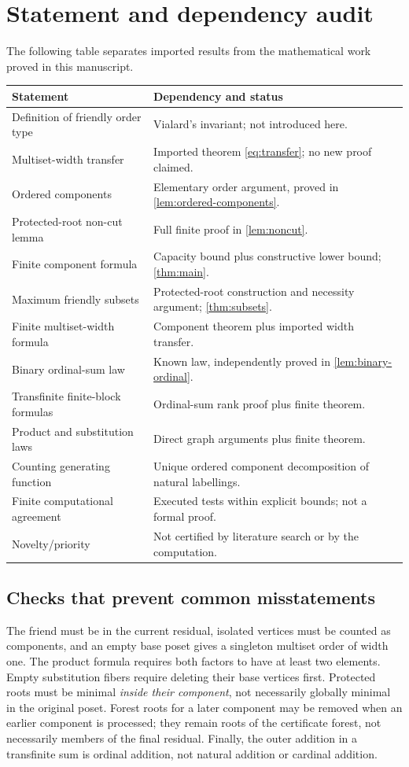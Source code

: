 \documentclass[11pt,letterpaper]{article}
\theoremstyle{definition}
\theoremstyle{remark}
\begin{document}
\section{Statement and dependency audit}
\label{sec:audit}
The following table separates imported results from the mathematical work
proved in this manuscript.
\begin{center}
\small
\begin{tabular}{p{} p{}}
\toprule
Statement & Dependency and status\\
\midrule
Definition of friendly order type & Vialard's invariant; not introduced here.\\
Multiset-width transfer & Imported theorem \eqref{eq:transfer}; no new proof claimed.\\
Ordered components & Elementary order argument, proved in \cref{lem:ordered-components}.\\
Protected-root non-cut lemma & Full finite proof in \cref{lem:noncut}.\\
Finite component formula & Capacity bound plus constructive lower bound; \cref{thm:main}.\\
Maximum friendly subsets & Protected-root construction and necessity argument; \cref{thm:subsets}.\\
Finite multiset-width formula & Component theorem plus imported width transfer.\\
Binary ordinal-sum law & Known law, independently proved in \cref{lem:binary-ordinal}.\\
Transfinite finite-block formulas & Ordinal-sum rank proof plus finite theorem.\\
Product and substitution laws & Direct graph arguments plus finite theorem.\\
Counting generating function & Unique ordered component decomposition of natural labellings.\\
Finite computational agreement & Executed tests within explicit bounds; not a formal proof.\\
Novelty/priority & Not certified by literature search or by the computation.\\
\bottomrule
\end{tabular}
\end{center}

\subsection*{Checks that prevent common misstatements}
The friend must be in the current residual, isolated vertices must be counted
as components, and an empty base poset gives a singleton multiset order of
width one. The product formula requires both factors to have at least two
elements. Empty substitution fibers require deleting their base vertices
first. Protected roots must be minimal \emph{inside their component}, not
necessarily globally minimal in the original poset. Forest roots for a later
component may be removed when an earlier component is processed; they remain
roots of the certificate forest, not necessarily members of the final residual.
Finally, the outer addition in a transfinite sum is ordinal addition, not
natural addition or cardinal addition.
\end{document}
